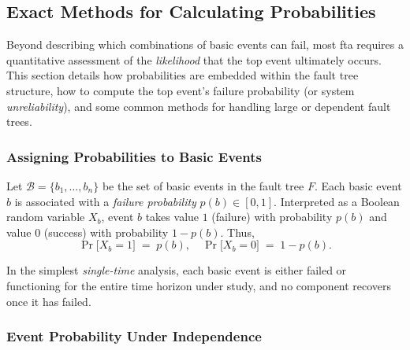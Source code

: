 \subsection{Exact Methods for Calculating Probabilities}

Beyond describing which combinations of basic events can fail, most \acrfull{fta} requires a quantitative assessment of the \emph{likelihood} that the top event ultimately occurs. This section details how probabilities are embedded within the fault tree structure, how to compute the top event's failure probability (or system \emph{unreliability}), and some common methods for handling large or dependent fault trees.

\subsubsection{Assigning Probabilities to Basic Events}

Let \(\mathcal{B}=\{b_1, \dots, b_n\}\) be the set of basic events in the fault tree \(F\).  Each basic event \(b\) is associated with a \emph{failure probability} \(p(b)\in [0,1]\).  Interpreted as a Boolean random variable \(X_b\), event \(b\) takes value \(1\) (failure) with probability \(p(b)\) and value \(0\) (success) with probability \(1-p(b)\).  Thus, 
\[
\Pr\bigl[X_b = 1\bigr] \;=\; p(b), 
\quad
\Pr\bigl[X_b = 0\bigr] \;=\; 1-p(b).
\]

In the simplest \emph{single-time} analysis, each basic event is either failed or functioning for the entire time horizon under study, and no component recovers once it has failed.

\subsubsection{Event Probability Under Independence}

